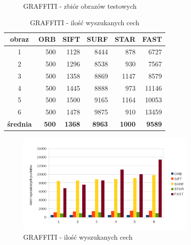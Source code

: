 \begin{figure}[!htb]
\begin{center}
{}
\caption{GRAFFITI - zbiór obrazów testowych}
\label{fig:graffiti_set}
\end{center}
\end{figure}
\FloatBarrier


\begin{table}[htbp]
  \centering
  \caption{GRAFFITI - ilość wyszukanych cech}
    \begin{tabular}{|c|r|r|r|r|r|}\hline
    
    obraz & \textbf{ORB} & \textbf{SIFT} & \textbf{SURF} & \textbf{STAR} & \textbf{FAST} \\\hline
    
   
    1 & 500 & 1128 & 8444 & 878 & 6727 \\
    2 & 500 & 1296 & 8538 & 930 & 7567 \\
    3 & 500 & 1358 & 8869 & 1147 & 8579 \\
    4 & 500 & 1445 & 8888 & 973 & 11146 \\
    5 & 500 & 1500 & 9165 & 1164 & 10053 \\
    6 & 500 & 1478 & 9875 & 910 & 13459 \\\hline
    \textbf{średnia} & \textbf{500} & \textbf{1368} & \textbf{8963} & \textbf{1000} & \textbf{9589} \\
    \hline
    \end{tabular}%
  \label{tab:graffiti_f1}%
\end{table}%


\begin{figure}
\centering
\includegraphics[width=0.8\textwidth]{pict/mikolajczyk/graff/f1.png}
\caption{GRAFFITI - ilość wyszukanych cech}
\end{figure}



